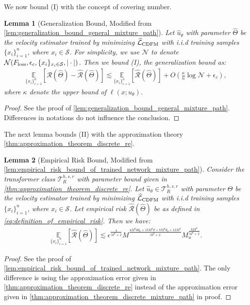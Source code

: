 \documentclass[12pt]{article}
\numberwithin{equation}{section}
\let\hat\widehat
\newcommand{\wh}{\widehat}
\renewcommand{\hat}{\wh}
\DeclareMathOperator*{\E}{{\mathbb{E}}}
\def\E{\mathbb{E}}
\theoremstyle{theoremstyle}
\newtheorem{lemma}{Lemma}[section]
\numberwithin{equation}{section}
\numberwithin{theorem}{section}
\numberwithin{proposition}{section}
\numberwithin{definition}{section}
\numberwithin{lemma}{section}
\numberwithin{assumption}{section}
\numberwithin{remark}{section}
\begin{document}
We now bound (I) with the concept of covering number.
\begin{lemma}[Generalization Bound, Modified from \cref{lem:generalization_bound_general_mixture_path}]\label{lem:generalization_bound_general}
Let $\hat{u}_\theta$ with parameter $\hat{\Theta}$ be the velocity estimator trained by minimizing $\hat{\mathcal{L}}_{\rm CDFM}$ with i.i.d training samples $\{x_i\}_{i=1}^n$, where $x_i\in \mathcal{S}$.
For simplicity, we use $\mathcal{N}$ to denote $\mathcal{N}(F_{\rm loss},\epsilon_c,\{x_i\}_{x_i\in \mathcal{S}},|\cdot|)$.
Then we bound (I), the generalization bound as:
\begin{align*}
    \underset{\{x_i\}_{i=1}^n}{\E}[\mathcal{R}(\hat{\Theta})-\hat{\mathcal{R}}(\hat{\Theta})] \lesssim \underset{\{x_i\}_{i=1}^n}{\E}[\hat{\mathcal{R}}(\hat{\Theta})]+O(\frac{\kappa}{n}\log\mathcal{N}+\epsilon_c),
\end{align*}
where $\kappa$ denote the upper bound of $\ell(x;u_\theta)$.
\end{lemma}

\begin{proof}
See the proof of \cref{lem:generalization_bound_general_mixture_path}.
Differences in notations do not influence the conclusion.
\end{proof}

The next lemma bounds (II) with the approximation theory \cref{thm:approximation_theorem_discrete_re}.

\begin{lemma}[Empirical Risk Bound, Modified from \cref{lem:empirical_risk_bound_of_trained_network_mixture_path}]\label{lem:empirical_risk_bound_of_trained_network}
Consider the transformer class $\mathcal{T}^{h,s,r}_R$ with parameter bound given in \cref{thm:approximation_theorem_discrete_re}.
Let $\hat{u}_\theta\in\mathcal{T}^{h,s,r}_R$ with parameter $\hat{\Theta}$ be the velocity estimator trained by minimizing $\hat{\mathcal{L}}_{\rm CDFM}$ with i.i.d training samples $\{x_i\}_{i=1}^n$, where $x_i\in \mathcal{S}$.
Let empirical risk $\hat{\mathcal{R}}(\hat{\Theta})$ be as defined in \eqref{eq:definition_of_empirical_risk}.
Then we have:
\begin{align*}
    \underset{\{x_i\}_{i=1}^n}{\E}[\hat{\mathcal{R}}(\hat{\Theta})]\lesssim   \epsilon^\frac{4}{M^d+2}M^{\frac{4M^ddd_0+13M^dd+8M^dd_0+12M^d}{M^d+2}}M_u^{\frac{8M^d}{M^d+2}}.
\end{align*}
\end{lemma}

\begin{proof}

See the proof of \cref{lem:empirical_risk_bound_of_trained_network_mixture_path}.
The only difference is using the approximation error given in \cref{thm:approximation_theorem_discrete_re} instead of the approximation error given in \cref{thm:approximation_theorem_discrete_mixture_path} in proof.
\end{proof}
\end{document}
